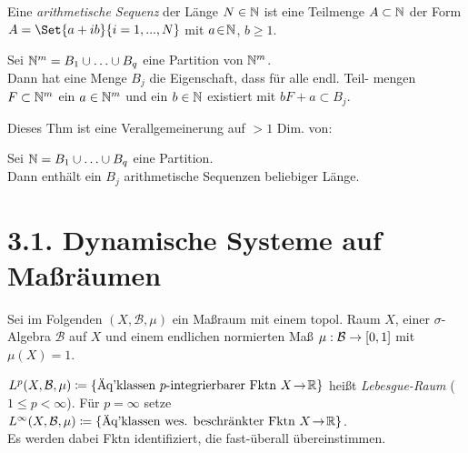 \documentclass{cheat-sheet}
\newcommand{\Bor}{\mathcal{B}} %
\begin{document}
\begin{defn}
  Eine \emph{arithmetische Sequenz} der Länge $N \in \mathbb{N}$ ist eine Teilmenge $A \subset \mathbb{N}$ der Form $A = \Set{a + ib}{i = 1, \nldots, N}$ mit $a \!\in\! \mathbb{N}$, $b \!\geq\! 1$.
\end{defn}

\begin{thm}
  Sei $\mathbb{N}^m = B_1 \cup \ldots \cup B_q$ eine Partition von $\mathbb{N}^m$. \\
  Dann hat eine Menge $B_j$ die Eigenschaft, dass für alle endl. Teil- mengen $F \subset \mathbb{N}^m$ ein $a \in \mathbb{N}^m$ und ein $b \in \mathbb{N}$ existiert mit $bF + a \subset B_j$.
\end{thm}

\begin{bem}
  Dieses Thm ist eine Verallgemeinerung auf $>\!1$ Dim. von:
\end{bem}

\begin{thm}
  Sei $\mathbb{N} = B_1 \cup \ldots \cup B_q$ eine Partition. \\
  Dann enthält ein $B_j$ arithmetische Sequenzen beliebiger Länge.
\end{thm}





\section{3.1. Dynamische Systeme auf Maßräumen}

\begin{bem}
  Sei im Folgenden $(X, \Bor, \mu)$ ein Maßraum mit einem topol. Raum $X$, einer $\sigma$-Algebra $\Bor$ auf $X$ und einem endlichen normierten Maß $\mu : \Bor \to \cinterval{0}{1}$ mit $\mu(X) = 1$.
\end{bem}

\begin{nota}
  $L^p(X, \Bor, \mu) \coloneqq \{ \text{Äq'klassen $p$-integrierbarer Fktn $X \!\to\! \R$} \}$ heißt \emph{Lebesgue-Raum} ($1 \leq p < \infty$). Für $p = \infty$ setze
  $L^\infty(X, \Bor, \mu) \coloneqq \{ \text{Äq'klassen wes. beschränkter Fktn $X \!\to\! \R$} \}$. \\
  Es werden dabei Fktn identifiziert, die fast-überall übereinstimmen.
\end{nota}
\end{document}
